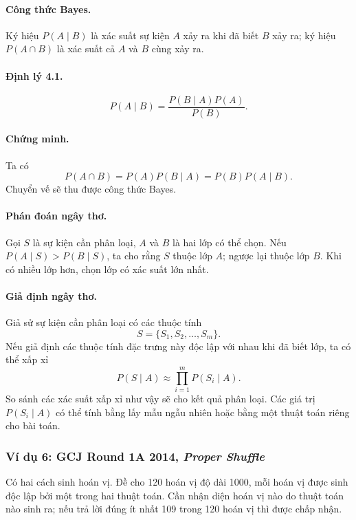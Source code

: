\documentclass[11pt]{article}
\begin{document}
\paragraph{Công thức Bayes.}
Ký hiệu \(P(A\mid B)\) là xác suất sự kiện \(A\) xảy ra khi đã biết \(B\) xảy
ra; ký hiệu \(P(A\cap B)\) là xác suất cả \(A\) và \(B\) cùng xảy ra.

\paragraph{Định lý 4.1.}
\[
  P(A\mid B)=\frac{P(B\mid A)P(A)}{P(B)}.
\]

\paragraph{Chứng minh.}
Ta có
\[
  P(A\cap B)=P(A)P(B\mid A)=P(B)P(A\mid B).
\]
Chuyển vế sẽ thu được công thức Bayes.

\paragraph{Phán đoán ngây thơ.}
Gọi \(S\) là sự kiện cần phân loại, \(A\) và \(B\) là hai lớp có thể chọn. Nếu
\(P(A\mid S)>P(B\mid S)\), ta cho rằng \(S\) thuộc lớp \(A\); ngược lại thuộc
lớp \(B\). Khi có nhiều lớp hơn, chọn lớp có xác suất lớn nhất.

\paragraph{Giả định ngây thơ.}
Giả sử sự kiện cần phân loại có các thuộc tính
\[
  S=\{S_1,S_2,\ldots,S_m\}.
\]
Nếu giả định các thuộc tính đặc trưng này độc lập với nhau khi đã biết lớp, ta
có thể xấp xỉ
\[
  P(S\mid A)\approx \prod_{i=1}^m P(S_i\mid A).
\]
So sánh các xác suất xấp xỉ như vậy sẽ cho kết quả phân loại. Các giá trị
\(P(S_i\mid A)\) có thể tính bằng lấy mẫu ngẫu nhiên hoặc bằng một thuật toán
riêng cho bài toán.

\subsubsection{Ví dụ 6: GCJ Round 1A 2014, \emph{Proper Shuffle}}

Có hai cách sinh hoán vị. Đề cho 120 hoán vị độ dài 1000, mỗi hoán vị được sinh
độc lập bởi một trong hai thuật toán. Cần nhận diện hoán vị nào do thuật toán
nào sinh ra; nếu trả lời đúng ít nhất 109 trong 120 hoán vị thì được chấp nhận.
\end{document}
